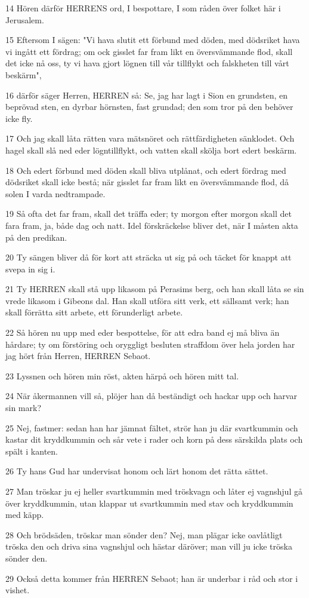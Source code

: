 \par 14 Hören därför HERRENS ord, I bespottare, I som råden över folket här i Jerusalem.
\par 15 Eftersom I sägen: "Vi hava slutit ett förbund med döden, med dödsriket hava vi ingått ett fördrag; om ock gisslet far fram likt en översvämmande flod, skall det icke nå oss, ty vi hava gjort lögnen till vår tillflykt och falskheten till vårt beskärm",
\par 16 därför säger Herren, HERREN så: Se, jag har lagt i Sion en grundsten, en beprövad sten, en dyrbar hörnsten, fast grundad; den som tror på den behöver icke fly.
\par 17 Och jag skall låta rätten vara mätsnöret och rättfärdigheten sänklodet. Och hagel skall slå ned eder lögntillflykt, och vatten skall skölja bort edert beskärm.
\par 18 Och edert förbund med döden skall bliva utplånat, och edert fördrag med dödsriket skall icke bestå; när gisslet far fram likt en översvämmande flod, då solen I varda nedtrampade.
\par 19 Så ofta det far fram, skall det träffa eder; ty morgon efter morgon skall det fara fram, ja, både dag och natt. Idel förskräckelse bliver det, när I måsten akta på den predikan.
\par 20 Ty sängen bliver då för kort att sträcka ut sig på och täcket för knappt att svepa in sig i.
\par 21 Ty HERREN skall stå upp likasom på Perasims berg, och han skall låta se sin vrede likasom i Gibeons dal. Han skall utföra sitt verk, ett sällsamt verk; han skall förrätta sitt arbete, ett förunderligt arbete.
\par 22 Så hören nu upp med eder bespottelse, för att edra band ej må bliva än hårdare; ty om förstöring och oryggligt besluten straffdom över hela jorden har jag hört från Herren, HERREN Sebaot.
\par 23 Lyssnen och hören min röst, akten härpå och hören mitt tal.
\par 24 När åkermannen vill så, plöjer han då beständigt och hackar upp och harvar sin mark?
\par 25 Nej, fastmer: sedan han har jämnat fältet, strör han ju där svartkummin och kastar dit kryddkummin och sår vete i rader och korn på dess särskilda plats och spält i kanten.
\par 26 Ty hans Gud har undervisat honom och lärt honom det rätta sättet.
\par 27 Man tröskar ju ej heller svartkummin med tröskvagn och låter ej vagnshjul gå över kryddkummin, utan klappar ut svartkummin med stav och kryddkummin med käpp.
\par 28 Och brödsäden, tröskar man sönder den? Nej, man plägar icke oavlåtligt tröska den och driva sina vagnshjul och hästar däröver; man vill ju icke tröska sönder den.
\par 29 Också detta kommer från HERREN Sebaot; han är underbar i råd och stor i vishet.

